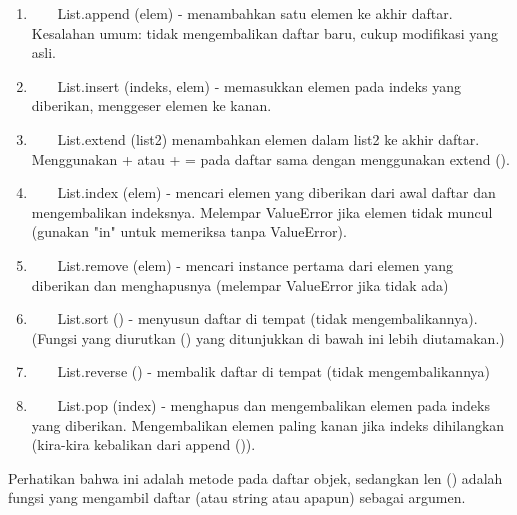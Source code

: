 \begin{enumerate}
\item
~~~ List.append (elem) - menambahkan satu elemen ke akhir daftar. Kesalahan umum: tidak mengembalikan daftar baru, cukup modifikasi yang asli. \par
\item
~~~ List.insert (indeks, elem) - memasukkan elemen pada indeks yang diberikan, menggeser elemen ke kanan. \par
\item
~~~ List.extend (list2) menambahkan elemen dalam list2 ke akhir daftar. Menggunakan + atau + = pada daftar sama dengan menggunakan extend (). \par
\item
~~~ List.index (elem) - mencari elemen yang diberikan dari awal daftar dan mengembalikan indeksnya. Melempar ValueError jika elemen tidak muncul (gunakan "in" untuk memeriksa tanpa ValueError). \par
\item
~~~ List.remove (elem) - mencari instance pertama dari elemen yang diberikan dan menghapusnya (melempar ValueError jika tidak ada) \par
\item
~~~ List.sort () - menyusun daftar di tempat (tidak mengembalikannya). (Fungsi yang diurutkan () yang ditunjukkan di bawah ini lebih diutamakan.) \par
\item
~~~ List.reverse () - membalik daftar di tempat (tidak mengembalikannya) \par
\item
~~~ List.pop (index) - menghapus dan mengembalikan elemen pada indeks yang diberikan. Mengembalikan elemen paling kanan jika indeks dihilangkan (kira-kira kebalikan dari append ()). \par
\end{enumerate}
\vspace{12pt}
Perhatikan bahwa ini adalah \* metode \* pada daftar objek, sedangkan len () adalah fungsi yang mengambil daftar (atau string atau apapun) sebagai argumen. \par
\vspace{12pt}
\vspace{12pt}

